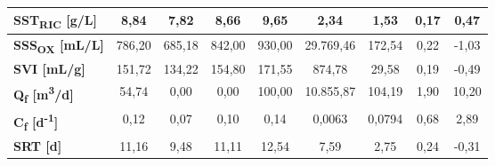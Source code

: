 \begin{sidewaystable}[h]
\begin{center}
\begin{tabular}{lcccccccc}
		\multicolumn{1}{|l|}{\textbf{SST\textsubscript{RIC} {[}g/L{]}}}         & \multicolumn{1}{c|}{8,84}           & \multicolumn{1}{c|}{7,82}                    & \multicolumn{1}{c|}{8,66}             & \multicolumn{1}{c|}{9,65}                    & \multicolumn{1}{c|}{2,34}              & \multicolumn{1}{c|}{1,53}              & \multicolumn{1}{c|}{0,17}        & \multicolumn{1}{c|}{0,47}           \\ \hline
		\multicolumn{1}{|l|}{\textbf{SSS\textsubscript{OX} {[}mL/L{]}}}         & \multicolumn{1}{c|}{786,20}         & \multicolumn{1}{c|}{685,18}                  & \multicolumn{1}{c|}{842,00}           & \multicolumn{1}{c|}{930,00}                  & \multicolumn{1}{c|}{29.769,46}         & \multicolumn{1}{c|}{172,54}            & \multicolumn{1}{c|}{0,22}        & \multicolumn{1}{c|}{-1,03}          \\ \hline
		\multicolumn{1}{|l|}{\textbf{SVI {[}mL/g{]}}}           & \multicolumn{1}{c|}{151,72}         & \multicolumn{1}{c|}{134,22}                  & \multicolumn{1}{c|}{154,80}           & \multicolumn{1}{c|}{171,55}                  & \multicolumn{1}{c|}{874,78}            & \multicolumn{1}{c|}{29,58}             & \multicolumn{1}{c|}{0,19}        & \multicolumn{1}{c|}{-0,49}          \\ \hline
		\multicolumn{1}{|l|}{\textbf{Q\textsubscript{f}  {[}m\textsuperscript{3}/d{]}}}           & \multicolumn{1}{c|}{54,74}         & \multicolumn{1}{c|}{0,00}                    & \multicolumn{1}{c|}{0,00}           & \multicolumn{1}{c|}{100,00}                  & \multicolumn{1}{c|}{10.855,87}         & \multicolumn{1}{c|}{104,19}            & \multicolumn{1}{c|}{1,90}        & \multicolumn{1}{c|}{10,20}          \\ \hline
		\multicolumn{1}{|l|}{\textbf{C\textsubscript{f} {[}d\textsuperscript{-1}{]}}}             & \multicolumn{1}{c|}{0,12}           & \multicolumn{1}{c|}{0,07}                    & \multicolumn{1}{c|}{0,10}             & \multicolumn{1}{c|}{0,14}                    & \multicolumn{1}{c|}{0,0063}            & \multicolumn{1}{c|}{0,0794}            & \multicolumn{1}{c|}{0,68}        & \multicolumn{1}{c|}{2,89}           \\ \hline
		\multicolumn{1}{|l|}{\textbf{SRT {[}d{]}}}              & \multicolumn{1}{c|}{11,16}           & \multicolumn{1}{c|}{9,48}                    & \multicolumn{1}{c|}{11,11}             & \multicolumn{1}{c|}{12,54}                    & \multicolumn{1}{c|}{7,59}            & \multicolumn{1}{c|}{2,75}             & \multicolumn{1}{c|}{0,24}        & \multicolumn{1}{c|}{-0,31}           \\ \hline

\end{tabular}
\end{center}
\end{sidewaystable}
